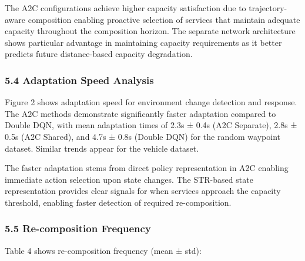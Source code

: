 The A2C configurations achieve higher capacity satisfaction due to
trajectory-aware composition enabling proactive selection of services
that maintain adequate capacity throughout the composition horizon. The
separate network architecture shows particular advantage in maintaining
capacity requirements as it better predicts future distance-based
capacity degradation.

\hypertarget{adaptation-speed-analysis}{%
	\subsubsection{5.4 Adaptation Speed
		Analysis}\label{adaptation-speed-analysis}}

Figure 2 shows adaptation speed for environment change detection and
response. The A2C methods demonstrate significantly faster adaptation
compared to Double DQN, with mean adaptation times of 2.3s ± 0.4s (A2C
Separate), 2.8s ± 0.5s (A2C Shared), and 4.7s ± 0.8s (Double DQN) for
the random waypoint dataset. Similar trends appear for the vehicle
dataset.

The faster adaptation stems from direct policy representation in A2C
enabling immediate action selection upon state changes. The STR-based
state representation provides clear signals for when services approach
the capacity threshold, enabling faster detection of required
re-composition.

\hypertarget{re-composition-frequency}{%
	\subsubsection{5.5 Re-composition
		Frequency}\label{re-composition-frequency}}

Table 4 shows re-composition frequency (mean ± std):

